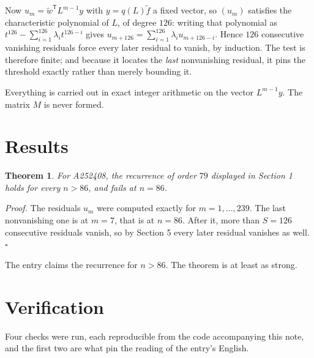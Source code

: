 \documentclass[11pt]{article}
\newtheorem{theorem}{Theorem}
\theoremstyle{definition}
\begin{document}
Now $u_m = \tilde w^{\mathsf T} L^{m-1} y$ with $y = q(L)\tilde f$ a fixed vector, so $(u_m)$ satisfies the characteristic polynomial of $L$, of degree $126$: writing that polynomial as $t^{126} - \sum_{i=1}^{126} \lambda_i t^{126-i}$ gives $u_{m+126} = \sum_{i=1}^{126} \lambda_i u_{m+126-i}$. Hence $126$ consecutive vanishing residuals force every later residual to vanish, by induction. The test is therefore finite; and because it locates the {\itshape last} nonvanishing residual, it pins the threshold exactly rather than merely bounding it.

Everything is carried out in exact integer arithmetic on the vector $L^{m-1}y$. The matrix $M$ is never formed.

\section{Results}

\begin{theorem} For A252408, the recurrence of order $79$ displayed in Section 1 holds for every $n > 86$, and fails at $n = 86$.\end{theorem}

{\itshape Proof.} The residuals $u_m$ were computed exactly for $m = 1,\dots,239$. The last nonvanishing one is at $m = 7$, that is at $n = 86$. After it, more than $S = 126$ consecutive residuals vanish, so by Section 5 every later residual vanishes as well. $\square$

The entry claims the recurrence for $n > 86$. The theorem is at least as strong.

\section{Verification}

Four checks were run, each reproducible from the code accompanying this note, and the first two are what pin the reading of the entry's English.
\end{document}
